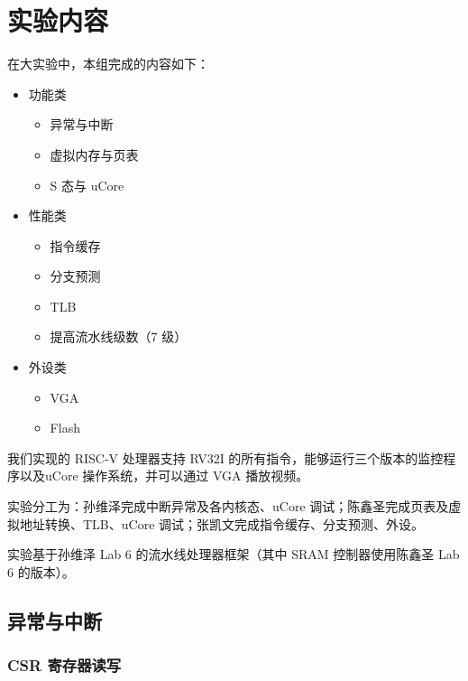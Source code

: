 \documentclass[12pt,a4paper,oneside]{ctexart}
\begin{document}
\section{实验内容}

在大实验中，本组完成的内容如下：
\begin{itemize}
    \item 功能类 \begin{itemize}
        \item 异常与中断
        \item 虚拟内存与页表
        \item S 态与 uCore
    \end{itemize}
    \item 性能类 \begin{itemize}
        \item 指令缓存
        \item 分支预测
        \item TLB
        \item 提高流水线级数（7 级）
    \end{itemize}
    \item 外设类 \begin{itemize}
        \item VGA
        \item Flash
    \end{itemize}
\end{itemize}

我们实现的 RISC-V 处理器支持 RV32I 的所有指令，能够运行三个版本的监控程序以及uCore 操作系统，并可以通过 VGA 播放视频。

实验分工为：孙维泽完成中断异常及各内核态、uCore 调试；陈鑫圣完成页表及虚拟地址转换、TLB、uCore 调试；张凯文完成指令缓存、分支预测、外设。

实验基于孙维泽 Lab 6 的流水线处理器框架（其中 SRAM 控制器使用陈鑫圣 Lab 6 的版本）。

\subsection{异常与中断}

\subsubsection{CSR 寄存器读写}
\end{document}
